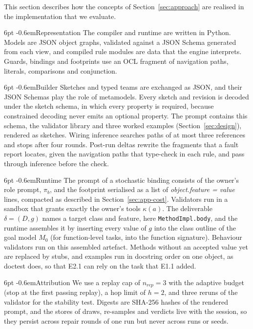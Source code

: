 \documentclass[pdflatex,sn-mathphys-num]{sn-jnl}
\makeatletter
\theoremstyle{thmstyleone}%
\theoremstyle{thmstyletwo}%
\theoremstyle{thmstylethree}%
\newcommand{\code}[1]{\texttt{#1}}
\renewcommand\paragraph{\@startsection{paragraph}{4}{\z@}%
  {6pt \@plus 2pt \@minus 1pt}{-0.6em}{\normalfont\normalsize\bfseries}}
\makeatother
\begin{document}
This section describes how the concepts of Section~\ref{sec:approach} are
realised in the implementation that we evaluate.

\paragraph{Representation} The compiler and runtime are written in Python.
Models are JSON object graphs, validated against a JSON Schema generated from
each view, and compiled rule modules are data that the engine interprets.
Guards, bindings and footprints use an OCL fragment of navigation paths,
literals, comparisons and conjunction.

\paragraph{Builder} Sketches and typed teams are exchanged as JSON, and their
JSON Schemas play the role of metamodels. Every sketch and revision is decoded
under the sketch schema, in which every property is required, because
constrained decoding never emits an optional property. The prompt contains this
schema, the validator library and three worked examples
(Section~\ref{sec:design}), rendered as sketches. Wiring inference searches
paths of at most three references and stops after four rounds. Post-run deltas
rewrite the fragments that a fault report locates, given the navigation paths
that type-check in each rule, and pass through inference before the check.

\paragraph{Runtime} The prompt of a stochastic binding consists of the owner's
role prompt, $\pi_b$, and the footprint serialised as a list of
\emph{object.feature = value} lines, compacted as described in
Section~\ref{sec:app-cost}. Validators run in a sandbox that grants exactly the
owner's tools $\kappa(a)$. The deliverable $\delta=(D,g)$ names a target class
and feature, here \code{MethodImpl.body}, and the runtime assembles it by
inserting every value of $g$ into the class outline of the goal model $M_0$
(for function-level tasks, into the function signature).
Behaviour validators run on this assembled artefact. Methods without an
accepted value yet are replaced by stubs, and examples run in docstring order
on one object, as doctest does, so that E2.1 can rely on the task that E1.1
added.

\paragraph{Attribution} We use a replay cap of $n_{\mathit{rep}}=3$ with the
adaptive budget (stop at the first passing replay), a hop limit of $h=2$, and
three reruns of the validator for the stability test. Digests are SHA-256
hashes of the rendered prompt, and the stores of draws, re-samples and verdicts
live with the session, so they persist across repair rounds of one run but
never across runs or seeds.
\end{document}
